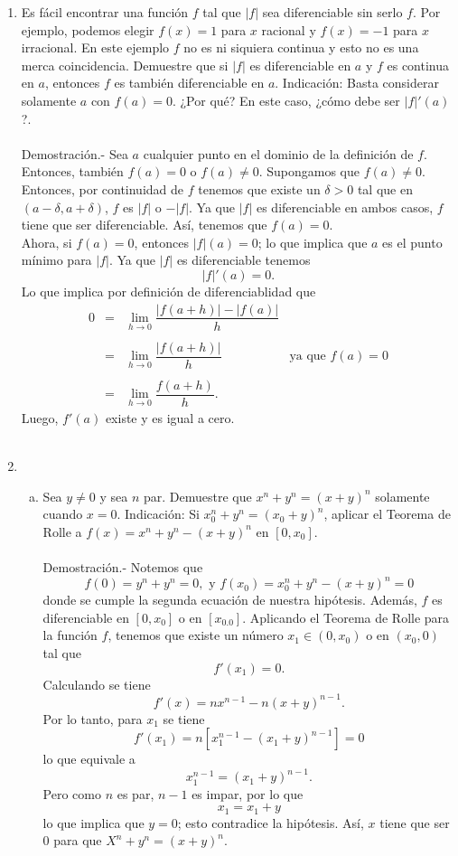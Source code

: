 \begin{enumerate}[\bfseries 1.]
    \item Es fácil encontrar una función $f$ tal que $|f|$ sea diferenciable sin serlo $f$. Por ejemplo, podemos elegir $f(x)=1$ para $x$ racional y $f(x)=-1$ para $x$ irracional. En este ejemplo $f$ no es ni siquiera continua y esto no es una merca coincidencia. Demuestre que si $|f|$ es diferenciable en $a$ y $f$ es continua en $a$, entonces $f$ es también diferenciable en $a$. Indicación: Basta considerar solamente $a$ con $f(a)=0$. ¿Por qué? En este caso, ¿cómo debe ser $|f|'(a)$?.\\\\
	Demostración.-\; Sea $a$ cualquier punto en el dominio de la definición de $f$. Entonces, también $f(a)=0$ o $f(a)\neq 0$. Supongamos que $f(a)\neq 0$. Entonces, por continuidad de $f$ tenemos que existe un $\delta>0$ tal que en $(a-\delta,a+\delta)$, $f$ es $|f|$ o $-|f|$. Ya que $|f|$ es diferenciable en ambos casos, $f$ tiene que ser diferenciable. Así, tenemos que $f(a)=0$.\\
	Ahora, si $f(a)=0$, entonces $|f|(a)=0$; lo que implica que $a$ es el punto mínimo para $|f|$. Ya que $|f|$ es diferenciable tenemos
	$$|f|'(a)=0.$$
	Lo que implica por definición de diferenciablidad que
	$$
	\begin{array}{rcll}
	    0 &=& \displaystyle\lim_{h\to 0} \dfrac{|f(a+h)|-|f(a)|}{h}&\\\\
	      &=& \displaystyle\lim_{h\to 0} \dfrac{|f(a+h)|}{h}&\mbox{ya que }f(a)=0\\\\
	      &=& \displaystyle\lim_{h\to 0} \dfrac{f(a+h)}{h}.
	\end{array}
	$$
	Luego, $f'(a)$ existe y es igual a cero.\\\\

    \item 
	\begin{enumerate}[(a)]

	    \item Sea $y\neq 0$ y sea $n$ par. Demuestre que $x^n+y^n=(x+y)^n$ solamente cuando $x=0$. Indicación: Si $x_0^n+y^n= (x_0+y)^n$, aplicar el Teorema de Rolle a $f(x)=x^n+y^n-(x+y)^n$ en $[0,x_0]$.\\\\
		Demostración.-\; Notemos que
		$$f(0)=y^n+y^n=0, \mbox{ y } f(x_0)=x_0^n+y^n-(x+y)^n=0$$
		donde se cumple  la segunda ecuación de nuestra hipótesis. Además, $f$ es diferenciable en $[0,x_0]$ o en $[x_0.0]$. Aplicando el Teorema de Rolle para la función $f$, tenemos que existe un número $x_1\in (0,x_0)$ o en $(x_0,0)$ tal que
		$$f'(x_1)=0.$$
		Calculando se tiene
		$$f'(x)=n x^{n-1}-n(x+y)^{n-1}.$$
		Por lo tanto, para $x_1$ se tiene
		$$f'(x_1)=n\left[x_1^{n-1}-(x_1+y)^{n-1}\right]=0$$
		lo que equivale a
		$$x_1^{n-1}=(x_1+y)^{n-1}.$$
		Pero como $n$ es par, $n-1$ es impar, por lo que
		$$x_1=x_1+y$$
		lo que implica que $y=0$; esto contradice la hipótesis. Así, $x$ tiene que ser $0$ para que $X^n+y^n=(x+y)^n$.\\\\


\end{enumerate}
\end{enumerate}

